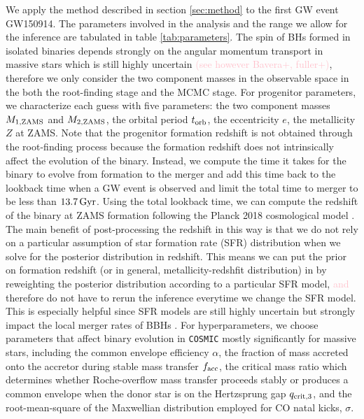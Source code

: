 \documentclass[twocolumn]{aastex631}
\newcommand{\kb}[1]{\textcolor{pink}{#1}}
\begin{document}
We apply the method described in section \ref{sec:method} to the first GW event GW150914.
The parameters involved in the analysis and the range we allow for the inference are tabulated in table \ref{tab:parameters}.
The spin of BHs formed in isolated binaries depends strongly on the angular 
momentum transport in massive stars which is still highly uncertain \kb{(see however Bavera+, fuller+)},
therefore we only consider the two component masses in the observable space in the both the 
root-finding stage and the MCMC stage. For progenitor parameters, we characterize each guess with 
five parameters: the two component masses $M_{\rm 1,ZAMS}$ and $M_{\rm 2,ZAMS}$, the orbital period $t_{\rm orb}$, 
the eccentricity $e$, the metallicity $Z$ at ZAMS. Note that the progenitor formation redshift is not 
obtained through the root-finding process because the formation redshift does not intrinsically affect 
the evolution of the binary. Instead, we compute the time it takes for the binary to evolve from 
formation to the merger and add this time back to the lookback time when a GW event is observed and limit the total 
time to merger to be less than $13.7\,\rm{Gyr}$.
Using the total lookback time, we can compute the redshift of the binary at ZAMS formation following the 
Planck 2018 cosmological model \citep{Planck2018}.
The main benefit of post-processing the redshift in this way is that we do not rely on a particular assumption
of star formation rate (SFR) distribution when we solve for the posterior distribution in redshift.
This means we can put the prior on formation redshift (or in general, metallicity-redshfit distribution) in
by reweighting the posterior distribution according to a particular SFR model,
\kb{and} therefore do not have to rerun the inference everytime we change the SFR model. This is especially helpful
since SFR models are still highly uncertain but strongly impact the local merger rates of BBHs \citep{Broekgaarden2021}.
For hyperparameters, we choose parameters that affect 
binary evolution in \texttt{COSMIC} mostly significantly for massive stars, including the common envelope 
efficiency $\alpha$, the fraction of mass accreted onto the accretor during stable mass transfer $f_{\rm acc}$, 
the critical mass ratio which determines whether Roche-overflow mass transfer 
proceeds stably or produces a common envelope when the donor star is on the Hertzsprung gap 
$q_{\rm crit,3}$, and the root-mean-square of the Maxwellian distribution
employed for CO natal kicks, $\sigma$. 
\end{document}
